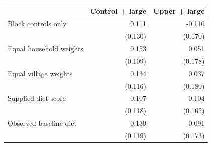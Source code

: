 \begin{tabular}{lrr}
\toprule
 & Control + large & Upper + large \\
\midrule
Block controls only & 0.111 & -0.110 \\
 & (0.130) & (0.170) \\
Equal household weights & 0.153 & 0.051 \\
 & (0.109) & (0.178) \\
Equal village weights & 0.134 & 0.037 \\
 & (0.116) & (0.180) \\
Supplied diet score & 0.107 & -0.104 \\
 & (0.118) & (0.162) \\
Observed baseline diet & 0.139 & -0.091 \\
 & (0.119) & (0.173) \\
\bottomrule
\end{tabular}

